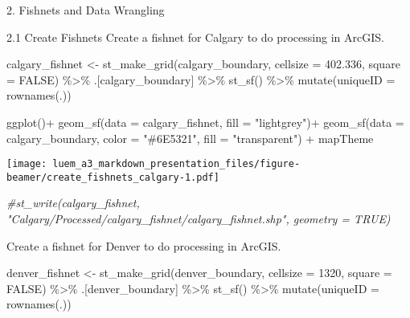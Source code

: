 \documentclass[
  ignorenonframetext,
]{beamer}
\newenvironment{Shaded}{\begin{snugshade}}{\end{snugshade}}
\newcommand{\AttributeTok}[1]{\textcolor[rgb]{0.77,0.63,0.00}{#1}}
\newcommand{\CommentTok}[1]{\textcolor[rgb]{0.56,0.35,0.01}{\textit{#1}}}
\newcommand{\ConstantTok}[1]{\textcolor[rgb]{0.00,0.00,0.00}{#1}}
\newcommand{\DecValTok}[1]{\textcolor[rgb]{0.00,0.00,0.81}{#1}}
\newcommand{\FloatTok}[1]{\textcolor[rgb]{0.00,0.00,0.81}{#1}}
\newcommand{\FunctionTok}[1]{\textcolor[rgb]{0.00,0.00,0.00}{#1}}
\newcommand{\NormalTok}[1]{#1}
\newcommand{\OtherTok}[1]{\textcolor[rgb]{0.56,0.35,0.01}{#1}}
\newcommand{\SpecialCharTok}[1]{\textcolor[rgb]{0.00,0.00,0.00}{#1}}
\newcommand{\StringTok}[1]{\textcolor[rgb]{0.31,0.60,0.02}{#1}}
\begin{document}
\begin{frame}[fragile]{2. Fishnets and Data Wrangling}
\protect\hypertarget{fishnets-and-data-wrangling}{}
\begin{block}{2.1 Create Fishnets}
\protect\hypertarget{create-fishnets}{}
Create a fishnet for Calgary to do processing in ArcGIS.

\begin{Shaded}
\begin{Highlighting}[]
\NormalTok{calgary\_fishnet }\OtherTok{\textless{}{-}} \FunctionTok{st\_make\_grid}\NormalTok{(calgary\_boundary,}
                        \AttributeTok{cellsize =} \FloatTok{402.336}\NormalTok{,}
                        \AttributeTok{square =} \ConstantTok{FALSE}\NormalTok{) }\SpecialCharTok{\%\textgreater{}\%} 
\NormalTok{  .[calgary\_boundary] }\SpecialCharTok{\%\textgreater{}\%} 
  \FunctionTok{st\_sf}\NormalTok{() }\SpecialCharTok{\%\textgreater{}\%} 
  \FunctionTok{mutate}\NormalTok{(}\AttributeTok{uniqueID =} \FunctionTok{rownames}\NormalTok{(.))}

\FunctionTok{ggplot}\NormalTok{()}\SpecialCharTok{+}
  \FunctionTok{geom\_sf}\NormalTok{(}\AttributeTok{data =}\NormalTok{ calgary\_fishnet,}
          \AttributeTok{fill =} \StringTok{"lightgrey"}\NormalTok{)}\SpecialCharTok{+}
  \FunctionTok{geom\_sf}\NormalTok{(}\AttributeTok{data =}\NormalTok{ calgary\_boundary, }
          \AttributeTok{color =} \StringTok{"\#6E5321"}\NormalTok{, }\AttributeTok{fill =} \StringTok{"transparent"}\NormalTok{) }\SpecialCharTok{+}
\NormalTok{  mapTheme}
\end{Highlighting}
\end{Shaded}

\texttt{[image: luem\_a3\_markdown\_presentation\_files/figure-beamer/create\_fishnets\_calgary-1.pdf]}

\begin{Shaded}
\begin{Highlighting}[]
\CommentTok{\#st\_write(calgary\_fishnet, "Calgary/Processed/calgary\_fishnet/calgary\_fishnet.shp", geometry = TRUE)}
\end{Highlighting}
\end{Shaded}

Create a fishnet for Denver to do processing in ArcGIS.

\begin{Shaded}
\begin{Highlighting}[]
\NormalTok{denver\_fishnet }\OtherTok{\textless{}{-}} \FunctionTok{st\_make\_grid}\NormalTok{(denver\_boundary,}
                        \AttributeTok{cellsize =} \DecValTok{1320}\NormalTok{,}
                        \AttributeTok{square =} \ConstantTok{FALSE}\NormalTok{) }\SpecialCharTok{\%\textgreater{}\%} 
\NormalTok{  .[denver\_boundary] }\SpecialCharTok{\%\textgreater{}\%} 
  \FunctionTok{st\_sf}\NormalTok{() }\SpecialCharTok{\%\textgreater{}\%} 
  \FunctionTok{mutate}\NormalTok{(}\AttributeTok{uniqueID =} \FunctionTok{rownames}\NormalTok{(.))}


\end{Highlighting}
\end{Shaded}
\end{block}
\end{frame}
\end{document}
